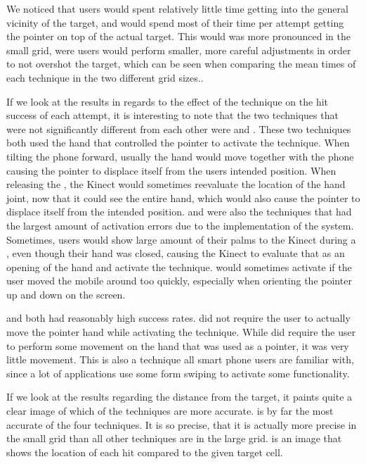 We noticed that users would spent relatively little time getting into the general vicinity of the target, and would spend most of their time per attempt getting the pointer on top of the actual target. This would was more pronounced in the small grid, were users would perform smaller, more careful adjustments in order to not overshot the target, which can be seen when comparing the mean times of each technique in the two different grid sizes..

If we look at the results in regards to the effect of the technique on the hit success of each attempt, it is interesting to note that the two techniques that were not significantly different from each other were \tilt and \pinch. These two techniques both used the hand that controlled the pointer to activate the technique. When tilting the phone forward, usually the hand would move together with the phone causing the pointer to displace itself from the users intended position. When releasing the \pinch, the Kinect would sometimes reevaluate the location of the hand joint, now that it could see the entire hand, which would also cause the pointer to displace itself from the intended position. \pinch and \tilt were also the techniques that had the largest amount of activation errors due to the implementation of the system.
Sometimes, users would show large amount of their palms to the Kinect during a \pinch, even though their hand was closed, causing the Kinect to evaluate that as an opening of the hand and activate the technique. \tilt would sometimes activate if the user moved the mobile around too quickly, especially when orienting the pointer up and down on the screen.  

\swipe and \throw both had reasonably high success rates. \throw did not require the user to actually move the pointer hand while activating the technique. While \swipe did require the user to perform some movement on the hand that was used as a pointer, it was very little movement. This is also a technique all smart phone users are familiar with, since a lot of applications use some form swiping to activate some functionality.

If we look at the results regarding the distance from the target, it paints quite a clear image of which of the techniques are more accurate. 
\swipe is by far the most accurate of the four techniques.
It is so precise, that it is actually more precise in the small grid than all other techniques are in the large grid. 
 is an image that shows the location of each hit compared to the given target cell. 

